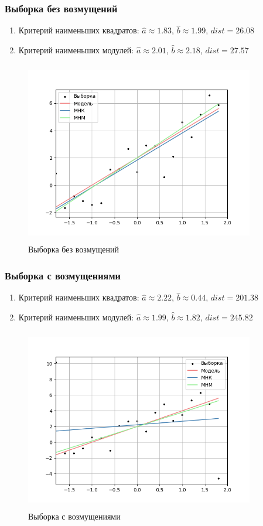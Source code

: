 \subsubsection{Выборка без возмущений}
\begin{enumerate}
	\item{Критерий наименьших квадратов:}
	$\hat{a}\approx 1.83$, $\hat{b}\approx 1.99$, $dist = 26.08$
	\item{Критерий наименьших модулей:}
	$\hat{a}\approx 2.01$, $\hat{b}\approx 2.18$, $dist = 27.57$
\end{enumerate}
\begin{figure}[H]
	\centering
	\includegraphics[width = 10cm, height = 8cm]{resources/6_1.png}
	\caption{Выборка без возмущений}
	\label{w/o_pert}
\end{figure}

\subsubsection{Выборка с возмущениями}
\begin{enumerate}
	\item{Критерий наименьших квадратов:}
	$\hat{a}\approx 2.22$, $\hat{b}\approx 0.44$, $dist = 201.38$
	\item{Критерий наименьших модулей:}
	$\hat{a}\approx 1.99$, $\hat{b}\approx 1.82$, $dist = 245.82$
\end{enumerate}
\begin{figure}[H]
	\centering
	\includegraphics[width = 10cm, height = 8cm]{resources/6_2.png}
	\caption{Выборка с возмущениями}
	\label{w_pert}
\end{figure}
